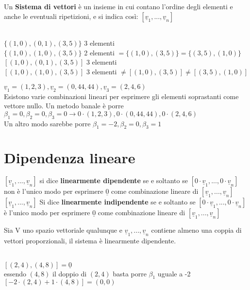   Un \textbf{Sistema di vettori} è un insieme in cui contano l'ordine
  degli elementi e anche le eventuali ripetizioni, e si indica così:
  $[\underline{v}_1,...,\underline{v}_n]$
  \begin{es}
    \phantom{}\\
    $\{(1,0),(0,1),(3,5)\}$ 3 elementi\\
    $\{(1,0),(1,0),(3,5)\}$ 2 elementi $=\{(1,0),(3,5)\}=\{(3,5),(1,0)\}$\\
    $[(1,0),(0,1),(3,5)]$ 3 elementi\\
    $[(1,0),(1,0),(3,5)]$ 3 elementi $\neq[(1,0),(3,5)]\neq[(3,5),(1,0)]$
  \end{es}
  \begin{nota}
    $\underline{v}_1=(1,2,3), \underline{v}_2=(0,44,44),
    \underline{v}_3=(2,4,6)$\\
    Esistono varie combinazioni lineari per esprimere gli elementi
    soprastanti come vettore nullo. Un metodo banale è porre
    $\beta_1=0,\beta_2=0,\beta_3=0 \longrightarrow
    0\cdot(1,2,3),0\cdot(0,44,44), 0\cdot(2,4,6)$\\
    Un altro modo sarebbe porre $\beta_1=-2,\beta_2=0,\beta_3=1$
  \end{nota}

  \section{Dipendenza lineare}
  $[\underline{v}_1,...,\underline{v}_n]$ si dice \textbf{linearmente
  dipendente} se e soltanto se $[0\cdot \underline{v}_1,...,0\cdot
  \underline{v}_n]$ non è l'unico modo per esprimere $\underline{0}$
  come combinazione lineare di $[\underline{v}_1,...,\underline{v}_n]$\\
  $[\underline{v}_1,...,\underline{v}_n]$ Si dice \textbf{linearmente
  indipendente} se e soltanto se $[0\cdot \underline{v}_1,...,0\cdot
  \underline{v}_n]$ è l'unico modo per esprimere $\underline{0}$ come
  combinazione lineare di $[\underline{v}_1,...,\underline{v}_n]$

  \begin{proposizione}
    Sia V uno spazio vettoriale qualunque e
    $\underline{v}_1,...,\underline{v}_n$ contiene almeno una coppia
    di vettori proporzionali, il sistema è linearmente dipendente.
    \begin{es}
      \phantom{text}\\
      $[(2,4),(4,8)]=\underline{0}$\\
      essendo $(4,8)$ il doppio di $(2,4)$ basta porre $\beta_1$ uguale a -2\\
      $[-2\cdot(2,4)+1\cdot(4,8)]=(0,0)$
    \end{es}
  \end{proposizione}

